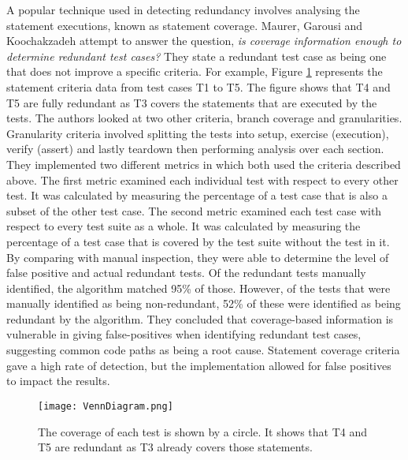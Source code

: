 A popular technique used in detecting redundancy involves analysing the statement executions, known as statement coverage. Maurer, Garousi and Koochakzadeh \cite{koochakzadeh2009test} attempt to answer the question, \textit{is coverage information enough to determine redundant test cases?} They state a redundant test case as being one that does not improve a specific criteria. For example, Figure \ref{fig:venndiagram} represents the statement criteria data from test cases T1 to T5. The figure shows that T4 and T5 are fully redundant as T3 covers the statements that are executed by the tests. The authors looked at two other criteria, branch coverage and granularities. Granularity criteria involved splitting the tests into setup, exercise (execution), verify (assert) and lastly teardown then performing analysis over each section. They implemented two different metrics in which both used the criteria described above. The first metric examined each individual test with respect to every other test. It was calculated by measuring the percentage of a test case that is also a subset of the other test case. The second metric examined each test case with respect to every test suite as a whole. It was calculated by measuring the percentage of a test case that is covered by the test suite without the test in it. By comparing with manual inspection, they were able to determine the level of false positive and actual redundant tests. Of the redundant tests manually identified, the algorithm matched 95\% of those. However, of the tests that were manually identified as being non-redundant, 52\% of these were identified as being redundant by the algorithm. They concluded that coverage-based information is vulnerable in giving false-positives when identifying redundant test cases, suggesting common code paths as being a root cause. Statement coverage criteria gave a high rate of detection, but the implementation allowed for false positives to impact the results. 

\begin{figure}[h]
\begin{center}
\texttt{[image: VennDiagram.png]}
\end{center}
\caption{The coverage of each test is shown by a circle. It shows that T4 and T5 are redundant as T3 already covers those statements.}
\label{fig:venndiagram}
\end{figure}


